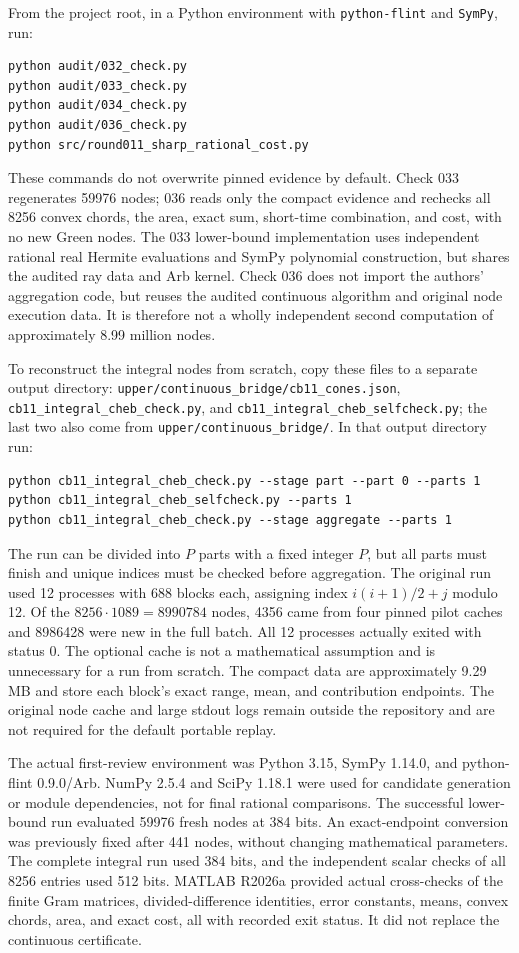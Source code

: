 \documentclass[11pt,a4paper]{article}
\theoremstyle{definition}\newtheorem{definition}[theorem]{Definition}
\theoremstyle{remark}\newtheorem{remark}[theorem]{Remark}
\newcommand{\src}[1]{\nolinkurl{#1}}
\begin{document}
From the project root, in a Python environment with \src{python-flint} and \src{SymPy}, run:
\begin{verbatim}
python audit/032_check.py
python audit/033_check.py
python audit/034_check.py
python audit/036_check.py
python src/round011_sharp_rational_cost.py
\end{verbatim}
These commands do not overwrite pinned evidence by default. Check 033 regenerates 59976 nodes; 036 reads only the compact evidence and rechecks all 8256 convex chords, the area, exact sum, short-time combination, and cost, with no new Green nodes. The 033 lower-bound implementation uses independent rational real Hermite evaluations and SymPy polynomial construction, but shares the audited ray data and Arb kernel. Check 036 does not import the authors' aggregation code, but reuses the audited continuous algorithm and original node execution data. It is therefore not a wholly independent second computation of approximately 8.99 million nodes.

To reconstruct the integral nodes from scratch, copy these files to a separate output directory: \src{upper/continuous_bridge/cb11_cones.json}, \src{cb11_integral_cheb_check.py}, and \src{cb11_integral_cheb_selfcheck.py}; the last two also come from \src{upper/continuous_bridge/}. In that output directory run:
\begin{verbatim}
python cb11_integral_cheb_check.py --stage part --part 0 --parts 1
python cb11_integral_cheb_selfcheck.py --parts 1
python cb11_integral_cheb_check.py --stage aggregate --parts 1
\end{verbatim}
The run can be divided into $P$ parts with a fixed integer $P$, but all parts must finish and unique indices must be checked before aggregation. The original run used 12 processes with 688 blocks each, assigning index $i(i+1)/2+j$ modulo 12. Of the $8256\cdot1089=8990784$ nodes, 4356 came from four pinned pilot caches and 8986428 were new in the full batch. All 12 processes actually exited with status $0$. The optional cache is not a mathematical assumption and is unnecessary for a run from scratch. The compact data are approximately 9.29 MB and store each block's exact range, mean, and contribution endpoints. The original node cache and large stdout logs remain outside the repository and are not required for the default portable replay.

The actual first-review environment was Python 3.15, SymPy 1.14.0, and python-flint 0.9.0/Arb. NumPy 2.5.4 and SciPy 1.18.1 were used for candidate generation or module dependencies, not for final rational comparisons. The successful lower-bound run evaluated 59976 fresh nodes at 384 bits. An exact-endpoint conversion was previously fixed after 441 nodes, without changing mathematical parameters. The complete integral run used 384 bits, and the independent scalar checks of all 8256 entries used 512 bits. MATLAB R2026a provided actual cross-checks of the finite Gram matrices, divided-difference identities, error constants, means, convex chords, area, and exact cost, all with recorded exit status. It did not replace the continuous certificate.
\end{document}
